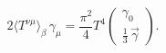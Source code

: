 \begin{equation}
\label{eq:t_high}
2\langle T^{\nu\mu}\rangle_\beta\,\gamma_\mu
=\frac{\pi^2}{4}T^4\left(\begin{array}{c}\gamma_0\\[1.5mm]
      \tfrac{1}{3}\,\vec\gamma\end{array} \right).
\end{equation}


